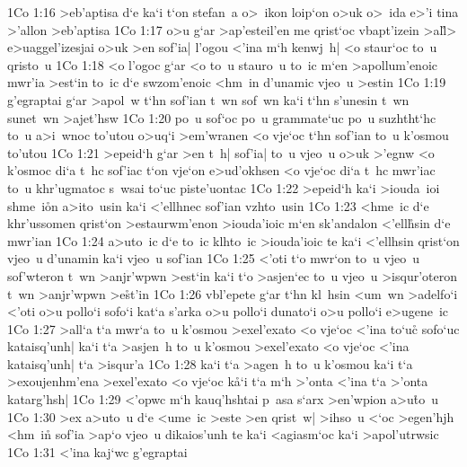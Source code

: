 \vs 1Co 1:16
>eb'aptisa
d`e
ka`i
t`on
stefan~a
o>~ikon
loip`on
o>uk
o>~ida
e>'i
tina
>'allon
>eb'aptisa\bibvsend
\vs 1Co 1:17
o>u
g`ar
>ap'esteil'en
me
qrist`oc
vbapt'izein
>al\r{l}>
e>uaggel'izesjai
o>uk
>en
sof'ia|
l'ogou
<'ina
m`h
kenwj~h|
<o
staur`oc
to~u
qristo~u\bibvsend
\vs 1Co 1:18
<o
l'ogoc
g`ar
<o
to~u
stauro~u
to~ic
m`en
>apollum'enoic
mwr'ia
>est`in
to~ic
d`e
swzom'enoic
<hm~in
d'unamic
vjeo~u
>estin\bibvsend
\vs 1Co 1:19
g'egraptai
g`ar
>apol~w
t`hn
sof'ian
t~wn
sof~wn
ka`i
t`hn
s'unesin
t~wn
sunet~wn
>ajet'hsw\bibvsend
\vs 1Co 1:20
po~u
sof`oc
po~u
grammate`uc
po~u
suzhtht`hc
to~u
a>i~wnoc
to'utou
o>uq`i
>em'wranen
<o
vje`oc
t`hn
sof'ian
to~u
k'osmou
to'u\r{t}ou\bibvsend
{}
\vs 1Co 1:21
>epeid`h
g`ar
>en
t~h|
sof'ia|
to~u
vjeo~u
o>uk
>'egnw
<o
k'osmoc
di`a
t~hc
sof'iac
t`on
vje`on
e>ud'okhsen
<o
vje`oc
di`a
t~hc
mwr'iac
to~u
khr'ugmatoc
s~wsai
to`uc
piste'uontac\bibvsend
\vs 1Co 1:22
>epeid`h
ka`i
>iouda~ioi
shme~i\r{o}n
a>ito~usin
ka`i
<'ellhnec
sof'ian
vzhto~usin\bibvsend
\vs 1Co 1:23
<hme~ic
d`e
khr'ussomen
qrist`on
>estaurwm'enon
>iouda'ioic
m`en
sk'andalon
<'ell\r{h}sin
d`e
mwr'ian\bibvsend
\vs 1Co 1:24
a>uto~ic
d`e
to~ic
klhto~ic
>iouda'ioic
te
ka`i
<'ellhsin
qrist`on
vjeo~u
d'unamin
ka`i
vjeo~u
sof'ian\bibvsend
\vs 1Co 1:25
<'oti
t`o
mwr`on
to~u
vjeo~u
sof'wteron
t~wn
>anjr'wpwn
>est`in
ka`i
t`o
>asjen`ec
to~u
vjeo~u
>isqur'oteron
t~wn
>anjr'wpwn
>e\r{s}t'in\bibvsend
{}
\vs 1Co 1:26
vbl'epete
g`ar
t`hn
kl~hsin
<um~wn
>adelfo`i
<'oti
o>u
pollo`i
sofo`i
kat`a
s'arka
o>u
pollo`i
dunato`i
o>u
pollo`i
e>ugene~ic\bibvsend
\vs 1Co 1:27
>all`a
t`a
mwr`a
to~u
k'osmou
>exel'exato
<o
vje`oc
<'ina
to`uc\r{}
sofo`uc
kataisq'unh|
ka`i
t`a
>asjen~h
to~u
k'osmou
>exel'exato
<o
vje`oc
<'ina
kataisq'unh|
t`a
>isqur'a\bibvsend
\vs 1Co 1:28
ka`i
t`a
>agen~h
to~u
k'osmou
ka`i
t`a
>exoujenhm'ena
>exel'exato
<o
vje`oc
k\r{a}`i
t`a
m`h
>'onta
<'ina
t`a
>'onta
katarg'hsh|\bibvsend
\vs 1Co 1:29
<'opwc
m`h
kauq'hshtai
p~asa
s`arx
>en'wpion
a>u\r{t}o~u\bibvsend
{}
\vs 1Co 1:30
>ex
a>uto~u
d`e
<ume~ic
>este
>en
qrist~w|
>ihso~u
<`oc
>egen'hjh
<hm~in\r{}
sof'ia
>ap`o
vjeo~u
dikaios'unh
te
ka`i
<agiasm`oc
ka`i
>apol'utrwsic\bibvsend
\vs 1Co 1:31
<'ina
kaj`wc
g'egraptai
